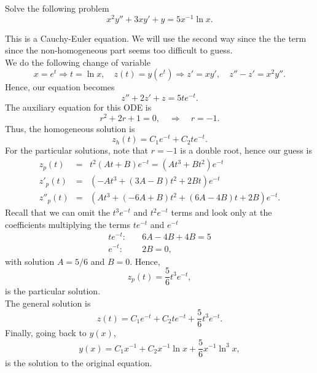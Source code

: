 \documentclass[11pt]{article}
\begin{document}
\begin{problem}
Solve the following problem
\begin{equation*}     
     x^{2}y''+3xy'+y=5x^{-1}\ln x.
\end{equation*}
\end{problem}
\begin{solution}
This is a Cauchy-Euler equation. We will use the second way since the the term since the non-homogeneous part seems too difficult to guess.\\
We do the following change of variable
\[x = e^{t} \Rightarrow t=\ln x, \quad z(t) = y(e^{t})\Rightarrow z' = xy', \quad z''-z'=x^{2}y''.\]
Hence, our equation becomes
\[z''+2z'+z=5te^{-t}.\]
The auxiliary equation for this ODE is 
\begin{equation}
r^2 +2r +1 =0, \quad  \Rightarrow \quad r= -1.
\end{equation}
Thus, the homogeneous solution is
\begin{equation}
z_{h}(t) = C_{1} e^{- t} + C_{2} te^{-t}.
\end{equation}
For the particular solutions, note that $r=-1$ is a double root, hence our guess is 
\begin{eqnarray*}
z_{p}(t) & = & t^{2}(At+B)e^{-t} = (At^{3}+Bt^{2})e^{-t} \\
z'_{p}(t) & = & (-At^{3}+(3A-B)t^{2}+2Bt)e^{-t} \\
z''_{p}(t) & = & (At^{3}+(-6A+B)t^{2}+(6A-4B)t+2B)e^{-t}.
\end{eqnarray*}
Recall that we can omit the $t^{3}e^{-t}$ and $t^{2}e^{-t}$ terms and look only at the coefficients multiplying the terms $te^{-t}$ and $e^{-t}$ 
\begin{equation*} \begin{split}
te^{-t}:& \quad  6A -4B +4B = 5 \\
e^{-t}:& \quad  2B =0,
\end{split}
\end{equation*}
with solution $A=5/6$ and $B=0$. Hence, 
$$z_{p}(t) = \frac{5}{6}t^{3}e^{-t},$$ 
is the particular solution.\\
The general solution is 
\[z(t)=  C_{1} e^{- t} + C_{2} te^{-t} +\frac{5}{6}t^{3}e^{-t}.\]
Finally, going back to $y(x)$,
\[\boxed{y(x)=C_{1}x^{-1}+C_{2}x^{-1}\ln x +\frac{5}{6}x^{-1}\ln^{3}x},\]
is the solution to the original equation.
\end{solution}
\end{document}
